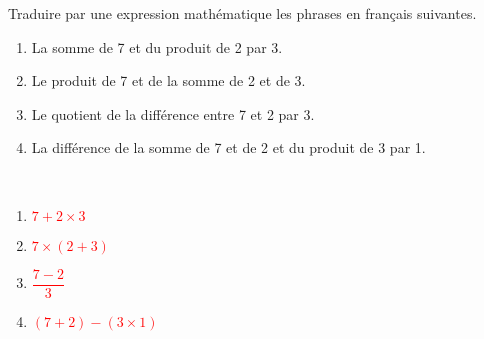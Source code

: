 \begin{exercice*}%
    Traduire par une expression mathématique les phrases en français suivantes.
    \begin{enumerate}
       \item La somme de 7 et du produit de 2 par 3.
       \item Le produit de 7 et de la somme de 2 et de 3.
       \item Le quotient de la différence entre 7 et 2 par 3.
       \item La différence de la somme de 7 et de 2 et du produit de 3 par 1.
    \end{enumerate}
 \end{exercice*}
 
 \begin{corrige}
    \ \\ [-5mm]
    \begin{enumerate}
       \item \textcolor{red}{$7+2\times3$}
       \item \textcolor{red}{$7\times(2+3)$} \smallskip
       \item \textcolor{red}{$\dfrac{7-2}{3}$} \medskip
       \item \textcolor{red}{$(7+2)-(3\times1)$}
    \end{enumerate}
 \end{corrige}